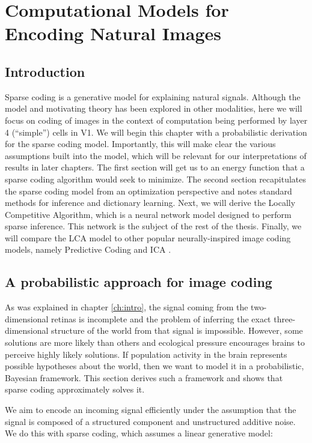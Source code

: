 \chapter{Computational Models for Encoding Natural Images}

\section{Introduction}
Sparse coding is a generative model for explaining natural signals. Although the model and motivating theory has been explored in other modalities, here we will focus on coding of images in the context of computation being performed by layer 4 (``simple'') cells in V1. We will begin this chapter with a probabilistic derivation for the sparse coding model. Importantly, this will make clear the various assumptions built into the model, which will be relevant for our interpretations of results in later chapters. The first section will get us to an energy function that a sparse coding algorithm would seek to minimize. The second section recapitulates the sparse coding model from an optimization perspective and notes standard methods for inference and dictionary learning. Next, we will derive the Locally Competitive Algorithm, which is a neural network model designed to perform sparse inference. This network is the subject of the rest of the thesis. Finally, we will compare the LCA model to other popular neurally-inspired image coding models, namely Predictive Coding \parencite{rao1999predictive} and ICA \parencite{bell1997independent}.

\section{A probabilistic approach for image coding}
As was explained in chapter \ref{ch:intro}, the signal coming from the two-dimensional retinas is incomplete and the problem of inferring the exact three-dimensional structure of the world from that signal is impossible. However, some solutions are more likely than others and ecological pressure encourages brains to perceive highly likely solutions. If population activity in the brain represents possible hypotheses about the world, then we want to model it in a probabilistic, Bayesian framework. This section derives such a framework and shows that sparse coding approximately solves it.

We aim to encode an incoming signal efficiently under the assumption that the signal is composed of a structured component and unstructured additive noise. We do this with sparse coding, which assumes a linear generative model:


